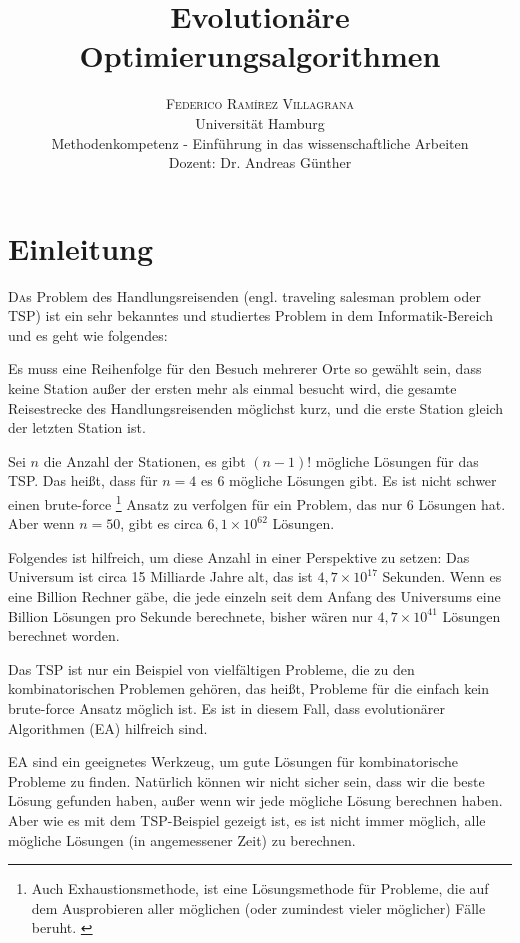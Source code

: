\documentclass[twoside,twocolumn]{article}
\title{Evolutionäre Optimierungsalgorithmen} %
\author {
	\textsc{Federico Ramírez Villagrana} \\[1ex]
	\normalsize Universität Hamburg \\
	\normalsize Methodenkompetenz - Einführung in das wissenschaftliche Arbeiten \\
	\normalsize Dozent: Dr. Andreas Günther
}
\date{} %
\newcommand{\e}[1]{\times 10^{#1}}
\begin{document}
\maketitle


\section{Einleitung}

\lettrine[nindent=0em,lines=3]{D} as Problem des Handlungsreisenden (engl. traveling salesman problem oder TSP) ist ein sehr bekanntes und studiertes Problem in dem Informatik-Bereich und es geht wie folgendes:\par
Es muss eine Reihenfolge für den Besuch mehrerer Orte so gewählt sein, dass keine Station außer der ersten mehr als einmal besucht wird, die gesamte Reisestrecke des Handlungsreisenden möglichst kurz, und die erste Station gleich der letzten Station ist. \cite{wiki_tsp}\par
Sei $n$ die Anzahl der Stationen, es gibt $(n-1)!$ mögliche Lösungen für das TSP. Das heißt, dass für $n=4$ es $6$ mögliche Lösungen gibt. Es ist nicht schwer einen brute-force \footnote{Auch Exhaustionsmethode, ist eine Lösungsmethode für Probleme, die auf dem Ausprobieren aller möglichen (oder zumindest vieler möglicher) Fälle beruht. \cite{wiki_brute_force}} Ansatz zu verfolgen für ein Problem, das nur 6 Lösungen hat. Aber wenn $n=50$, gibt es circa $6,1\e{62}$ Lösungen.\par
Folgendes ist hilfreich, um diese Anzahl in einer Perspektive zu setzen: Das Universum ist circa 15 Milliarde Jahre alt, das ist $4,7\e{17}$ Sekunden. Wenn es eine Billion Rechner gäbe, die jede einzeln seit dem Anfang des Universums eine Billion Lösungen pro Sekunde berechnete, bisher wären nur $4,7\e{41}$ Lösungen berechnet worden.\par
Das TSP ist nur ein Beispiel von vielfältigen Probleme, die zu den kombinatorischen Problemen gehören, das heißt, Probleme für die einfach kein brute-force Ansatz möglich ist. Es ist in diesem Fall, dass evolutionärer Algorithmen (EA) hilfreich sind.\par
EA sind ein geeignetes Werkzeug, um gute Lösungen für kombinatorische Probleme zu finden. Natürlich können wir nicht sicher sein, dass wir die beste Lösung gefunden haben, außer wenn wir jede mögliche Lösung berechnen haben. Aber wie es mit dem TSP-Beispiel gezeigt ist, es ist nicht immer möglich, alle mögliche Lösungen (in angemessener Zeit) zu berechnen.
\end{document}
